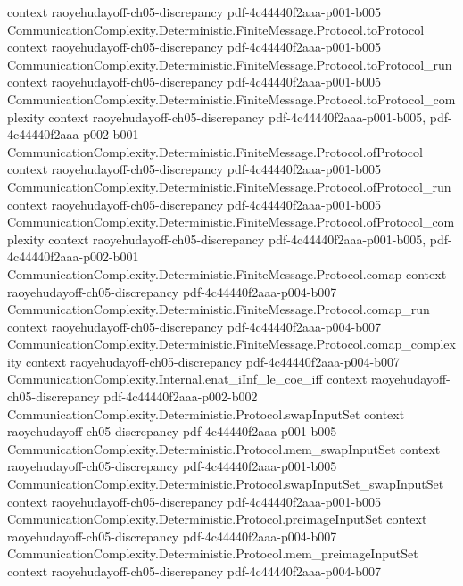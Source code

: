 \begin{lemma}
  {context}
  {raoyehudayoff-ch05-discrepancy}
  {pdf-4c44440f2aaa-p001-b005}
\proofstep
  {CommunicationComplexity.Deterministic.FiniteMessage.Protocol.toProtocol}
  {context}
  {raoyehudayoff-ch05-discrepancy}
  {pdf-4c44440f2aaa-p001-b005}
\proofstep
  {CommunicationComplexity.Deterministic.FiniteMessage.Protocol.toProtocol_run}
  {context}
  {raoyehudayoff-ch05-discrepancy}
  {pdf-4c44440f2aaa-p001-b005}
\proofstep
  {CommunicationComplexity.Deterministic.FiniteMessage.Protocol.toProtocol_complexity}
  {context}
  {raoyehudayoff-ch05-discrepancy}
  {pdf-4c44440f2aaa-p001-b005,
    pdf-4c44440f2aaa-p002-b001}
\proofstep
  {CommunicationComplexity.Deterministic.FiniteMessage.Protocol.ofProtocol}
  {context}
  {raoyehudayoff-ch05-discrepancy}
  {pdf-4c44440f2aaa-p001-b005}
\proofstep
  {CommunicationComplexity.Deterministic.FiniteMessage.Protocol.ofProtocol_run}
  {context}
  {raoyehudayoff-ch05-discrepancy}
  {pdf-4c44440f2aaa-p001-b005}
\proofstep
  {CommunicationComplexity.Deterministic.FiniteMessage.Protocol.ofProtocol_complexity}
  {context}
  {raoyehudayoff-ch05-discrepancy}
  {pdf-4c44440f2aaa-p001-b005,
    pdf-4c44440f2aaa-p002-b001}
\proofstep
  {CommunicationComplexity.Deterministic.FiniteMessage.Protocol.comap}
  {context}
  {raoyehudayoff-ch05-discrepancy}
  {pdf-4c44440f2aaa-p004-b007}
\proofstep
  {CommunicationComplexity.Deterministic.FiniteMessage.Protocol.comap_run}
  {context}
  {raoyehudayoff-ch05-discrepancy}
  {pdf-4c44440f2aaa-p004-b007}
\proofstep
  {CommunicationComplexity.Deterministic.FiniteMessage.Protocol.comap_complexity}
  {context}
  {raoyehudayoff-ch05-discrepancy}
  {pdf-4c44440f2aaa-p004-b007}
\proofstep
  {CommunicationComplexity.Internal.enat_iInf_le_coe_iff}
  {context}
  {raoyehudayoff-ch05-discrepancy}
  {pdf-4c44440f2aaa-p002-b002}
\proofstep
  {CommunicationComplexity.Deterministic.Protocol.swapInputSet}
  {context}
  {raoyehudayoff-ch05-discrepancy}
  {pdf-4c44440f2aaa-p001-b005}
\proofstep
  {CommunicationComplexity.Deterministic.Protocol.mem_swapInputSet}
  {context}
  {raoyehudayoff-ch05-discrepancy}
  {pdf-4c44440f2aaa-p001-b005}
\proofstep
  {CommunicationComplexity.Deterministic.Protocol.swapInputSet_swapInputSet}
  {context}
  {raoyehudayoff-ch05-discrepancy}
  {pdf-4c44440f2aaa-p001-b005}
\proofstep
  {CommunicationComplexity.Deterministic.Protocol.preimageInputSet}
  {context}
  {raoyehudayoff-ch05-discrepancy}
  {pdf-4c44440f2aaa-p004-b007}
\proofstep
  {CommunicationComplexity.Deterministic.Protocol.mem_preimageInputSet}
  {context}
  {raoyehudayoff-ch05-discrepancy}
  {pdf-4c44440f2aaa-p004-b007}
\proofstep

\end{lemma}

